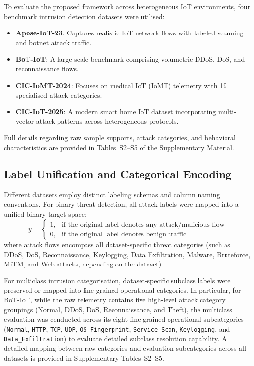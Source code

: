 \documentclass[a4paper,fleqn]{cas-sc}
\begin{document}
To evaluate the proposed framework across heterogeneous IoT environments, four benchmark intrusion detection datasets were utilised:
\begin{itemize}
    \item \textbf{Apose-IoT-23}: Captures realistic IoT network flows with labeled scanning and botnet attack traffic.
    \item \textbf{BoT-IoT}: A large-scale benchmark comprising volumetric DDoS, DoS, and reconnaissance flows.
    \item \textbf{CIC-IoMT-2024}: Focuses on medical IoT (IoMT) telemetry with 19 specialised attack categories.
    \item \textbf{CIC-IoT-2025}: A modern smart home IoT dataset incorporating multi-vector attack patterns across heterogeneous protocols.
\end{itemize}
Full details regarding raw sample supports, attack categories, and behavioral characteristics are provided in Tables~S2--S5 of the Supplementary Material.

\subsection{Label Unification and Categorical Encoding}

Different datasets employ distinct labeling schemas and column naming conventions. For binary threat detection, all attack labels were mapped into a unified binary target space:
\begin{equation}
y =
\begin{cases}
1, & \text{if the original label denotes any attack/malicious flow} \\
0, & \text{if the original label denotes benign traffic}
\end{cases}
\end{equation}
where attack flows encompass all dataset-specific threat categories (such as DDoS, DoS, Reconnaissance, Keylogging, Data Exfiltration, Malware, Bruteforce, MiTM, and Web attacks, depending on the dataset).

For multiclass intrusion categorisation, dataset-specific subclass labels were preserved or mapped into fine-grained operational categories. In particular, for BoT-IoT, while the raw telemetry contains five high-level attack category groupings (Normal, DDoS, DoS, Reconnaissance, and Theft), the multiclass evaluation was conducted across its eight fine-grained operational subcategories (\texttt{Normal}, \texttt{HTTP}, \texttt{TCP}, \texttt{UDP}, \texttt{OS\_Fingerprint}, \texttt{Service\_Scan}, \texttt{Keylogging}, and \texttt{Data\_Exfiltration}) to evaluate detailed subclass resolution capability. A detailed mapping between raw categories and evaluation subcategories across all datasets is provided in Supplementary Tables~S2--S5.
\end{document}
